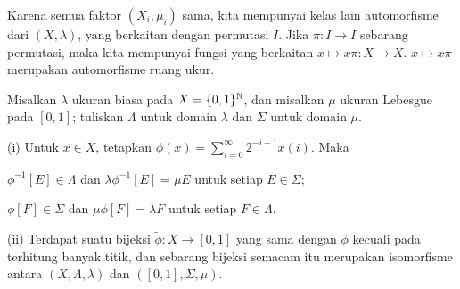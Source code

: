 
Karena semua faktor $(X_i,\mu_i)$ sama, kita
mempunyai kelas lain automorfisme dari $(X,\lambda)$, yang berkaitan dengan
permutasi $I$. Jika $\pi:I\to I$ sebarang permutasi, maka
kita mempunyai fungsi yang berkaitan $x\mapsto x\pi:X\to X$.  $x\mapsto x\pi$
merupakan automorfisme ruang ukur.

 Misalkan $\lambda$ ukuran biasa pada
$X=\{0,1\}^{\Bbb N}$, dan misalkan $\mu$ ukuran Lebesgue pada $[0,1]$;
tuliskan $\Lambda$ untuk domain $\lambda$ dan $\Sigma$ untuk domain
$\mu$.

(i) Untuk $x\in X$, tetapkan $\phi(x)=\sum_{i=0}^{\infty}2^{-i-1}x(i)$. Maka

\qquad $\phi^{-1}[E]\in\Lambda$ dan $\lambda\phi^{-1}[E]=\mu E$
untuk setiap $E\in\Sigma$;

\qquad $\phi[F]\in\Sigma$ dan $\mu\phi[F]=\lambda F$ untuk
setiap $F\in\Lambda$.

(ii) Terdapat suatu bijeksi $\tilde\phi:X\to[0,1]$ yang sama dengan
$\phi$ kecuali pada terhitung banyak titik, dan sebarang bijeksi semacam itu merupakan
isomorfisme antara $(X,\Lambda,\lambda)$ dan $([0,1],\Sigma,\mu)$.


